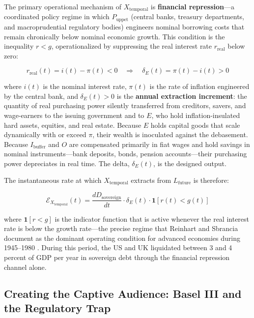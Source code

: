 The primary operational mechanism of $X_{\text{temporal}}$ is \textbf{financial repression}---a coordinated policy regime in which $P_{\text{uppet}}$ (central banks, treasury departments, and macroprudential regulatory bodies) engineers nominal borrowing costs that remain chronically below nominal economic growth. This condition is the inequality $r < g$, operationalized by suppressing the real interest rate $r_{\text{real}}$ below zero:

\begin{equation}\label{eq:10.16-financial-repression-condition}
r_{\text{real}}(t) = i(t) - \pi(t) < 0 \quad \Longrightarrow \quad \delta_E(t) = \pi(t) - i(t) > 0
\end{equation}

where $i(t)$ is the nominal interest rate, $\pi(t)$ is the rate of inflation engineered by the central bank, and $\delta_E(t) > 0$ is the \textbf{annual extraction increment}: the quantity of real purchasing power silently transferred from creditors, savers, and wage-earners to the issuing government and to $E$, who hold inflation-insulated hard assets, equities, and real estate. Because $E$ holds capital goods that scale dynamically with or exceed $\pi$, their wealth is inoculated against the debasement. Because $I_{\text{buffer}}$ and $O$ are compensated primarily in fiat wages and hold savings in nominal instruments---bank deposits, bonds, pension accounts---their purchasing power depreciates in real time. The delta, $\delta_E(t)$, is the designed output.

The instantaneous rate at which $X_{\text{temporal}}$ extracts from $L_{\text{future}}$ is therefore:

\begin{equation}\label{eq:10.17-temporal-extraction-rate}
\mathcal{E}_{X_{\text{temporal}}}(t) = \frac{d D_{\text{sovereign}}}{dt} \cdot \delta_E(t) \cdot \mathbf{1}[r(t) < g(t)]
\end{equation}

where $\mathbf{1}[r < g]$ is the indicator function that is active whenever the real interest rate is below the growth rate---the precise regime that Reinhart and Sbrancia document as the dominant operating condition for advanced economies during 1945--1980 \cite{reinhart_sbrancia_2015}. During this period, the US and UK liquidated between 3 and 4 percent of GDP per year in sovereign debt through the financial repression channel alone.

\subsection*{Creating the Captive Audience: Basel III and the Regulatory Trap}

